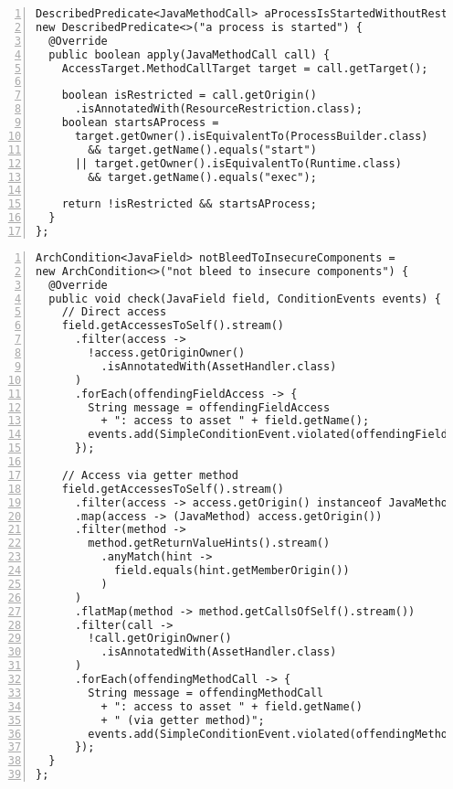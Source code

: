 \begin{lstlisting}[caption={Constraint 5: aProcessIsStartedWithoutRestriction custom predicate.}, captionpos=b, label=lst:constraint_5_predicate_2, numbers=left, showstringspaces=false]
DescribedPredicate<JavaMethodCall> aProcessIsStartedWithoutRestriction =
new DescribedPredicate<>("a process is started") {
  @Override
  public boolean apply(JavaMethodCall call) {
    AccessTarget.MethodCallTarget target = call.getTarget();

    boolean isRestricted = call.getOrigin()
      .isAnnotatedWith(ResourceRestriction.class);
    boolean startsAProcess =
      target.getOwner().isEquivalentTo(ProcessBuilder.class)
        && target.getName().equals("start")
      || target.getOwner().isEquivalentTo(Runtime.class)
        && target.getName().equals("exec");

    return !isRestricted && startsAProcess;
  }
};
\end{lstlisting}

\clearpage
\begin{lstlisting}[caption={Constraint 6: notBleedToInsecureComponents custom condition.}, captionpos=b, label=lst:constraint_6_condition, numbers=left, showstringspaces=false]
ArchCondition<JavaField> notBleedToInsecureComponents =
new ArchCondition<>("not bleed to insecure components") {
  @Override
  public void check(JavaField field, ConditionEvents events) {
    // Direct access
    field.getAccessesToSelf().stream()
      .filter(access -> 
        !access.getOriginOwner()
          .isAnnotatedWith(AssetHandler.class)
      )
      .forEach(offendingFieldAccess -> {
        String message = offendingFieldAccess
          + ": access to asset " + field.getName();
        events.add(SimpleConditionEvent.violated(offendingFieldAccess, message));
      });

    // Access via getter method
    field.getAccessesToSelf().stream()
      .filter(access -> access.getOrigin() instanceof JavaMethod)
      .map(access -> (JavaMethod) access.getOrigin())
      .filter(method ->
        method.getReturnValueHints().stream()
          .anyMatch(hint ->
            field.equals(hint.getMemberOrigin())
          )
      )
      .flatMap(method -> method.getCallsOfSelf().stream())
      .filter(call ->
        !call.getOriginOwner()
          .isAnnotatedWith(AssetHandler.class)
      )
      .forEach(offendingMethodCall -> {
        String message = offendingMethodCall
          + ": access to asset " + field.getName()
          + " (via getter method)";
        events.add(SimpleConditionEvent.violated(offendingMethodCall, message));
      });
  }
};
\end{lstlisting}

